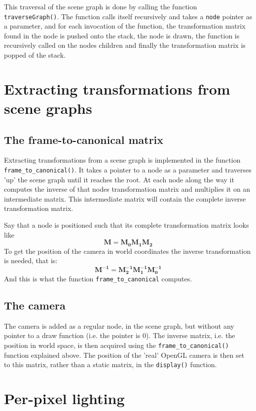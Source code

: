 \documentclass[10pt,a4paper]{article}
\begin{document}
This traversal of the scene graph is done by calling the function \texttt{traverseGraph()}. The function calls itself recursively and takes a \texttt{node} pointer as a parameter, and for each invocation of the function, the transformation matrix found in the node is pushed onto the stack, the node is drawn, the function is recursively called on the nodes children and finally the transformation matrix is popped of the stack.


\section{Extracting transformations from scene graphs}

\subsection{The frame-to-canonical matrix}
Extracting transformations from a scene graph is implemented in the function \texttt{frame\_to\_canonical()}. It takes a pointer to a node as a parameter and traverses 'up' the scene graph until it reaches the root. At each node along the way it computes the inverse of that nodes transformation matrix and multiplies it on an intermediate matrix. This intermediate matrix will contain the complete inverse transformation matrix.

Say that a node is positioned such that its complete transformation matrix looks like
\[
  \mathbf{M} = \mathbf{M_0}\mathbf{M_1}\mathbf{M_2}
\]
To get the position of the camera in world coordinates the inverse transformation is needed, that is:
\[
  \mathbf{M^{-1}} = \mathbf{M_2^{-1}}\mathbf{M_1^{-1}}\mathbf{M_0^{-1}}
\]
And this is what the function \texttt{frame\_to\_canonical} computes.

\subsection{The camera}
The camera is added as a regular node, in the scene graph, but without any pointer to a draw function (i.e. the pointer is 0). The inverse matrix, i.e. the position in world space, is then acquired using the \texttt{frame\_to\_canonical()} function explained above. The position of the 'real' OpenGL camera is then set to this matrix, rather than a static matrix, in the \texttt{display()} function.


\section{Per-pixel lighting}
\end{document}
